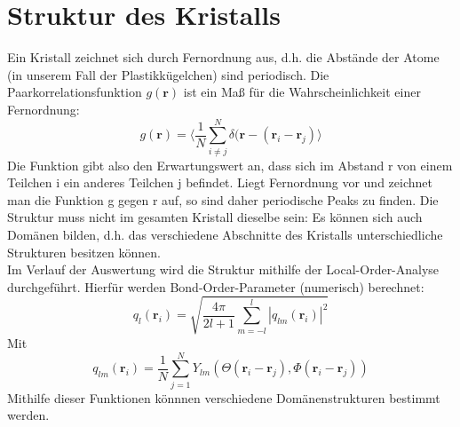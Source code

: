 \section{Struktur des Kristalls}
Ein Kristall zeichnet sich durch Fernordnung aus, d.h. die Abstände der Atome (in unserem Fall der Plastikkügelchen) sind periodisch. Die Paarkorrelationsfunktion $g(\textbf{r})$ ist ein Maß für die Wahrscheinlichkeit einer Fernordnung: 
$$
    g(\textbf{r})=\Big\langle\frac{1}{N}\sum_{i\neq j}^{N}\delta(\textbf{r}-(\textbf{r}_i-\textbf{r}_j)\Big\rangle
$$
Die Funktion gibt also den Erwartungswert an, dass sich im Abstand r von einem Teilchen i ein anderes Teilchen j befindet. Liegt Fernordnung vor und zeichnet man die Funktion g gegen r auf, so sind daher periodische Peaks zu finden. Die Struktur muss nicht im gesamten Kristall dieselbe sein: Es können sich auch Domänen bilden, d.h. das verschiedene \glqq Abschnitte\grqq{} des Kristalls unterschiedliche Strukturen besitzen können.
\\
Im Verlauf der Auswertung wird die Struktur mithilfe der Local-Order-Analyse durchgeführt. Hierfür werden Bond-Order-Parameter (numerisch) berechnet:
$$
    q_l(\textbf{r}_i)=\sqrt{\frac{4\pi}{2l+1}\sum_{m=-l}^{l}|q_{lm}(\textbf{r}_i)|^2}
$$
Mit
$$
    q_{lm}(\textbf{r}_i)=\frac{1}{N}\sum_{j=1}^{N}Y_{lm}(\Theta(\textbf{r}_i-\textbf{r}_j),\Phi(\textbf{r}_i-\textbf{r}_j))
$$
Mithilfe dieser Funktionen könnnen verschiedene Domänenstrukturen bestimmt werden.